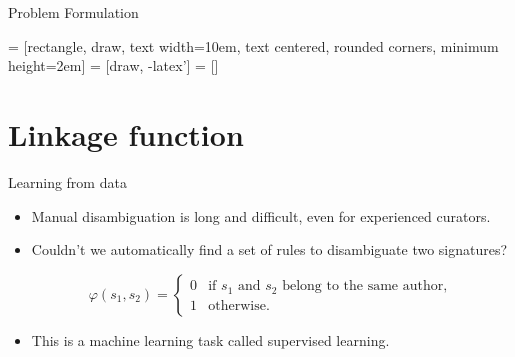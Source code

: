\documentclass{beamer}
\begin{document}
\begin{frame}{Problem Formulation}

 = [rectangle, draw, text width=10em, text centered, rounded corners, minimum height=2em]
 = [draw, -latex']
 = []

\begin{center}
\end{center}
\end{frame}



\section{Linkage function}

\begin{frame}{Learning from data}

\begin{itemize}
\item Manual disambiguation is {\color{red} long and difficult}, even for experienced curators.\\[2em]
\item Couldn't we {\color{blue} automatically find a set of rules} to disambiguate two signatures?

$$\varphi(s_1, s_2) = \begin{cases}
    0 & \text{if $s_1$ and $s_2$ belong to the same author},\\
    1 & \text{otherwise}.
  \end{cases}$$

\item This is a machine learning task called {\color{red}supervised learning}.
\end{itemize}

\end{frame}
\end{document}
